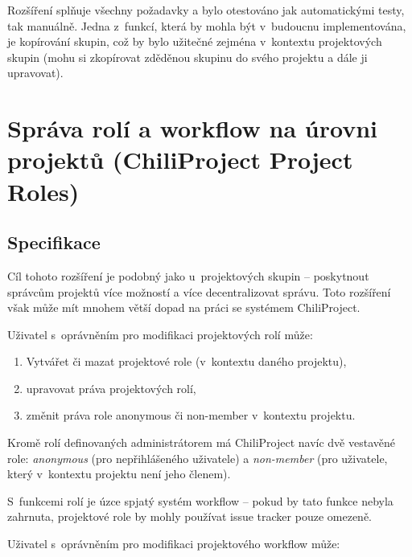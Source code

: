 \documentclass[thesis=B,czech]{FITthesis}[2012/05/02]
\begin{document}
Rozšíření splňuje všechny požadavky a bylo otestováno jak automatickými
testy, tak manuálně. Jedna z~funkcí, která by mohla být v~budoucnu
implementována, je kopírování skupin, což by bylo užitečné zejména
v~kontextu projektových skupin (mohu si zkopírovat zděděnou skupinu do
svého projektu a dále ji upravovat).

\section[Správa rolí a workflow na úrovni projektů]{Správa rolí a workflow na úrovni projektů (ChiliProject Project
Roles)}
\label{sec:project_roles}

\subsection{Specifikace}

Cíl tohoto rozšíření je podobný jako u~projektových skupin -- poskytnout
správcům projektů více možností a více decentralizovat správu. Toto
rozšíření však může mít mnohem větší dopad na práci se systémem
ChiliProject.

\vspace{3mm}

Uživatel s~oprávněním pro modifikaci projektových rolí může:

\vspace{-3mm}

\begin{enumerate}
\item
  Vytvářet či mazat projektové role (v~kontextu daného projektu),
\item
  upravovat práva projektových rolí,
\item
  změnit práva role anonymous či non-member v~kontextu projektu.
\end{enumerate}
Kromě rolí definovaných administrátorem má ChiliProject navíc dvě
vestavěné role: \emph{anonymous} (pro nepřihlášeného uživatele) a
\emph{non-member} (pro uživatele, který v~kontextu projektu není jeho
členem).

S~funkcemi rolí je úzce spjatý systém \gls{workflow} -- pokud by tato
funkce nebyla zahrnuta, projektové role by mohly používat
issue tracker pouze omezeně.

\vspace{3mm}

Uživatel s~oprávněním pro modifikaci projektového \gls{workflow} může:

\vspace{3mm}
\end{document}
